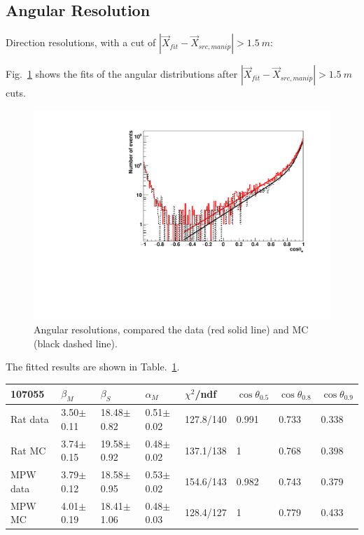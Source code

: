 \subsection{Angular Resolution}
Direction resolutions, with a cut of $|\vec{X}_{fit}-\vec{X}_{src,manip}|>1.5~m$:


Fig.~\ref{angularResolMPW} shows the fits of the angular distributions after $|\vec{X}_{fit}-\vec{X}_{src,manip}|>1.5~m$ cuts.
\begin{figure}
	\centering
	\includegraphics[width=160mm]{angularResol_107055_mpw.pdf}
	\caption{Angular resolutions, compared the data (red solid line) and MC (black dashed line).}
	\label{angularResolMPW}
\end{figure}

The fitted results are shown in Table.~\ref{angularResolValues}.
\begin{table}[ht]
\begin{tabular}{|p{2.2cm}|p{1.8cm}|p{2cm}|p{2cm}|p{1.8cm}|p{1.1cm}|p{1.1cm}|p{1.1cm}| }
	\hline
	107055& $\beta_M$ &  $\beta_S$ & $\alpha_M$ & $\chi^2$/ndf & $\cos\theta_{0.5}$ & $\cos\theta_{0.8}$& $\cos\theta_{0.9}$\\
	\hline
	Rat data & 3.50$\pm$0.11 & 18.48$\pm$0.82 & 0.51$\pm$0.02 & 127.8/140 & 0.991 & 0.733 & 0.338\\
	Rat MC  & 3.74$\pm$0.15 & 19.58$\pm$0.92 & 0.48$\pm$0.02 & 137.1/138 & 1 & 0.768 & 0.398\\	
	\hline
	MPW data & 3.79$\pm$0.12 & 18.58$\pm$0.95 & 0.53$\pm$0.02 & 154.6/143 & 0.982 & 0.743 & 0.379\\
	MPW MC &4.01$\pm$0.19 & 18.41$\pm$1.06 & 0.48$\pm$0.03 & 128.4/127 & 1 & 0.779 & 0.433  \\
	\hline
\end{tabular}
\label{angularResolValues}
\end{table}


